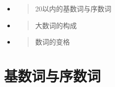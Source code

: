 \begin{itemize}
  \item
        \begin{quote}
          20以内的基数词与序数词
        \end{quote}
  \item
        \begin{quote}
          大数词的构成
        \end{quote}
  \item
        \begin{quote}
          数词的变格
        \end{quote}
\end{itemize}

\section{\texorpdfstring{\textbf{基数词与序数词}}{基数词与序数词}}\label{\texorpdfstring{\textbf{基数词与序数词}

下面是古诺尔斯语中基本的数词：

}}
